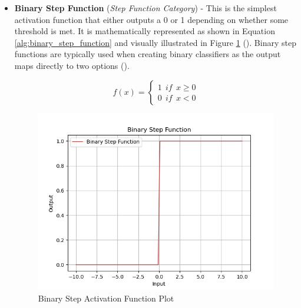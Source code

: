 \begin{itemize}
    \item \textbf{Binary Step Function} (\textit{Step Function Category}) - This is the simplest activation function that either outputs a 0 or 1 depending on whether some threshold is met. It is mathematically represented as shown in Equation \ref{alg:binary_step_function} and visually illustrated in Figure \ref{fig:ne_binary_step_plot} (\cite{sharma2017activation}). Binary step functions are typically used when creating binary classifiers as the output maps directly to two options (\cite{sharma2017activation}).
    
    \begin{equation}\label{alg:binary_step_function}
        f(x) = 
        \begin{cases} 
            1 \:\: if \:\: x \geq 0 \\
            0 \:\: if \:\: x < 0 
        \end{cases}
    \end{equation}

    \begin{figure}[H] %
        \centering %
        \includegraphics[width=\textwidth]{Figures/chapter_ne/ne_binary_step_plot.png} %
        \caption{Binary Step Activation Function Plot}
        \label{fig:ne_binary_step_plot} %
    \end{figure}


\end{itemize}
